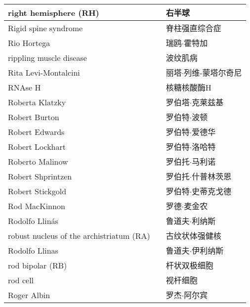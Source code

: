 \begin{longtable}{lll}
	\midrule
	right hemisphere (RH)  && 右半球  \\
	
	\midrule
	Rigid spine syndrome  && 脊柱强直综合症  \\
	
	\midrule
	Rio Hortega   && 瑞鸥$\cdot$霍特加  \\
	
	\midrule
	rippling muscle disease   && 波纹肌病  \\
	
	\midrule
	Rita Levi-Montalcini   && 丽塔$\cdot$列维-蒙塔尔奇尼  \\
	
	\midrule
	RNAse H   && 核糖核酸酶H  \\
	
	\midrule
	Roberta Klatzky   && 罗伯塔$\cdot$克莱兹基  \\
	
	\midrule
	Robert Burton   && 罗伯特$\cdot$波顿  \\
	
	\midrule
	Robert Edwards   && 罗伯特$\cdot$爱德华  \\
	
	\midrule
	Robert Lockhart   && 罗伯特$\cdot$洛哈特  \\
	
	\midrule
	Roberto Malinow   && 罗伯托$\cdot$马利诺  \\
	
	\midrule
	Robert Shprintzen   && 罗伯托$\cdot$什普林茨恩  \\
	
	\midrule
	Robert Stickgold   && 罗伯特$\cdot$史蒂克戈德  \\
	
	\midrule
	Rod MacKinnon   && 罗德$\cdot$麦金农  \\
	
	\midrule
	Rodolfo Llinás   && 鲁道夫$\cdot$利纳斯  \\
	
	\midrule
	robust nucleus of the archistriatum (RA)   && 古纹状体强健核  \\
	
	\midrule
	Rodolfo Llinas   && 鲁道夫$\cdot$伊利纳斯  \\
	
	\midrule
	rod bipolar (RB)  && 杆状双极细胞  \\
	
	\midrule
	rod cell   && 视杆细胞  \\
	
	\midrule
	Roger Albin   && 罗杰$\cdot$阿尔宾  \\
	

\end{longtable}
